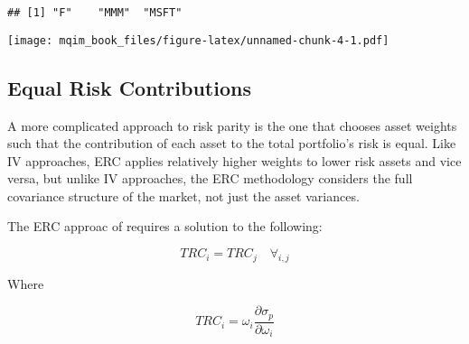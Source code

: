 \documentclass[]{book}
\newenvironment{Shaded}{\begin{snugshade}}{\end{snugshade}}
\newcommand{\KeywordTok}[1]{\textcolor[rgb]{0.13,0.29,0.53}{\textbf{#1}}}
\newcommand{\DataTypeTok}[1]{\textcolor[rgb]{0.13,0.29,0.53}{#1}}
\newcommand{\DecValTok}[1]{\textcolor[rgb]{0.00,0.00,0.81}{#1}}
\newcommand{\StringTok}[1]{\textcolor[rgb]{0.31,0.60,0.02}{#1}}
\newcommand{\OperatorTok}[1]{\textcolor[rgb]{0.81,0.36,0.00}{\textbf{#1}}}
\newcommand{\NormalTok}[1]{#1}
\theoremstyle{definition}
\theoremstyle{definition}
\theoremstyle{definition}
\theoremstyle{remark}
\begin{document}
\begin{verbatim}
## [1] "F"    "MMM"  "MSFT"
\end{verbatim}

\begin{Shaded}
\end{Shaded}

\texttt{[image: mqim\_book\_files/figure-latex/unnamed-chunk-4-1.pdf]}

\subsection{Equal Risk Contributions}\label{equal-risk-contributions}

A more complicated approach to risk parity is the one that chooses asset
weights such that the contribution of each asset to the total
portfolio's risk is equal. Like IV approaches, ERC applies relatively
higher weights to lower risk assets and vice versa, but unlike IV
approaches, the ERC methodology considers the full covariance structure
of the market, not just the asset variances.

The ERC approac of \citep{maillard2010} requires a solution to the
following:

\[
TRC_i = TRC_j \quad \forall_{i,j}
\]

Where

\[
TRC_i = \omega_i \frac{\partial \sigma_p}{\partial \omega_i}
\]
\end{document}

